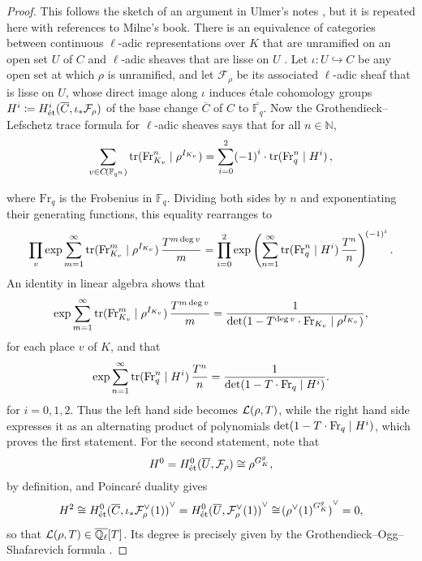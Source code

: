 \documentclass{article}
\theoremstyle{definition}
\theoremstyle{definition}
\newcommand{\et}{\text{\'et}}
\newcommand{\FF}{\mathbb{F}}
\newcommand{\FFF}{\mathcal{F}}
\newcommand{\Fr}{\mathrm{Fr}}
\newcommand{\LLL}{\mathcal{L}}
\newcommand{\NN}{\mathbb{N}}
\newcommand{\QQ}{\mathbb{Q}}
\newcommand{\st}{\mid}
\newcommand{\tr}{\mathrm{tr}}
\newcommand{\br}{\!\del[0]}
\begin{document}
\begin{proof}
This follows the sketch of an argument in Ulmer's notes \cite[Lecture 4, Theorem 1.4.1]{Ulm11}, but it is repeated here with references to Milne's book. There is an equivalence of categories between continuous $ \ell $-adic representations over $ K $ that are unramified on an open set $ U $ of $ C $ and $ \ell $-adic sheaves that are lisse on $ U $ \cite[Chapter V, Section 1]{Mil80}. Let $ \iota : U \hookrightarrow C $ be any open set at which $ \rho $ is unramified, and let $ \FFF_\rho $ be its associated $ \ell $-adic sheaf that is lisse on $ U $, whose direct image along $ \iota $ induces \'etale cohomology groups $ H^i \coloneqq H_\et^i\br{\overline{C}, \iota_*\FFF_\rho} $ of the base change $ \overline{C} $ of $ C $ to $ \overline{\FF_q} $. Now the Grothendieck--Lefschetz trace formula for $ \ell $-adic sheaves \cite[Chapter VI, Theorem 13.4]{Mil80} says that for all $ n \in \NN $,
$$ \sum_{v \in C\br{\FF_{q^n}}} \tr\br{\Fr_{K_v}^n \st \rho^{I_{K_v}}} = \sum_{i = 0}^2 \br{-1}^i \cdot \tr\br{\Fr_q^n \st H^i}, $$

\pagebreak

\noindent where $ \Fr_q $ is the Frobenius in $ \FF_q $. Dividing both sides by $ n $ and exponentiating their generating functions, this equality rearranges to
$$ \prod_v \exp\sum_{m = 1}^\infty \tr\br{\Fr_{K_v}^m \st \rho^{I_{K_v}}}\dfrac{T^{m\deg v}}{m} = \prod_{i = 0}^2 \exp\del[4]{\sum_{n = 1}^\infty \tr\br{\Fr_q^n \st H^i}\dfrac{T^n}{n}}^{\br{-1}^i}. $$
An identity in linear algebra \cite[Chapter V, Lemma 2.7]{Mil80} shows that
$$ \exp\sum_{m = 1}^\infty \tr\br{\Fr_{K_v}^m \st \rho^{I_{K_v}}}\dfrac{T^{m\deg v}}{m} = \dfrac{1}{\det\br{1 - T^{\deg v} \cdot \Fr_{K_v} \st \rho^{I_{K_v}}}}, $$
for each place $ v $ of $ K $, and that
$$ \exp\sum_{n = 1}^\infty \tr\br{\Fr_q^n \st H^i}\dfrac{T^n}{n} = \dfrac{1}{\det\br{1 - T \cdot \Fr_q \st H^i}}. $$
for $ i = 0, 1, 2 $. Thus the left hand side becomes $ \LLL\br{\rho, T} $, while the right hand side expresses it as an alternating product of polynomials $ \det\br{1 - T \cdot \Fr_q \st H^i} $, which proves the first statement. For the second statement, note that
$$ H^0 = H_\et^0\br{\overline{U}, \FFF_\rho} \cong \rho^{G_K^g}, $$
by definition, and Poincar\'e duality \cite[Chapter V, Proposition 2.2(c)]{Mil80} gives
$$ H^2 \cong H_\et^0\br{\overline{C}, \iota_*\FFF_\rho^\vee\br{1}}^\vee = H_\et^0\br{\overline{U}, \FFF_\rho^\vee\br{1}}^\vee \cong \br{\rho^\vee\br{1}^{G_K^g}}^\vee = 0, $$
so that $ \LLL\br{\rho, T} \in \overline{\QQ_\ell}\sbr{T} $. Its degree is precisely given by the Grothendieck--Ogg--Shafarevich formula \cite[Chapter V, Theorem 2.12]{Mil80}.
\end{proof}
\end{document}
